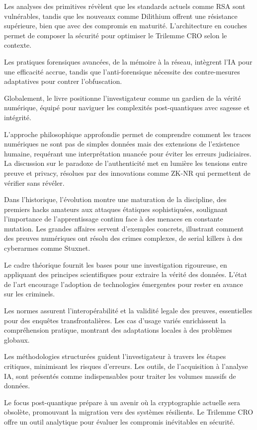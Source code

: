 \documentclass[a4paper,12pt]{extarticle}
\begin{document}
Les analyses des primitives révèlent que les standards actuels comme RSA sont vulnérables, tandis que les nouveaux comme Dilithium offrent une résistance supérieure, bien que avec des compromis en maturité. L'architecture en couches permet de composer la sécurité pour optimiser le Trilemme CRO selon le contexte.

Les pratiques forensiques avancées, de la mémoire à la réseau, intègrent l'IA pour une efficacité accrue, tandis que l'anti-forensique nécessite des contre-mesures adaptatives pour contrer l'obfuscation.

Globalement, le livre positionne l'investigateur comme un gardien de la vérité numérique, équipé pour naviguer les complexités post-quantiques avec sagesse et intégrité.

L'approche philosophique approfondie permet de comprendre comment les traces numériques ne sont pas de simples données mais des extensions de l'existence humaine, requérant une interprétation nuancée pour éviter les erreurs judiciaires. La discussion sur le paradoxe de l'authenticité met en lumière les tensions entre preuve et privacy, résolues par des innovations comme ZK-NR qui permettent de vérifier sans révéler.

Dans l'historique, l'évolution montre une maturation de la discipline, des premiers hacks amateurs aux attaques étatiques sophistiquées, soulignant l'importance de l'apprentissage continu face à des menaces en constante mutation. Les grandes affaires servent d'exemples concrets, illustrant comment des preuves numériques ont résolu des crimes complexes, de serial killers à des cyberarmes comme Stuxnet.

Le cadre théorique fournit les bases pour une investigation rigoureuse, en appliquant des principes scientifiques pour extraire la vérité des données. L'état de l'art encourage l'adoption de technologies émergentes pour rester en avance sur les criminels.

Les normes assurent l'interopérabilité et la validité legale des preuves, essentielles pour des enquêtes transfrontalières. Les cas d'usage variés enrichissent la compréhension pratique, montrant des adaptations locales à des problèmes globaux.

Les méthodologies structurées guident l'investigateur à travers les étapes critiques, minimisant les risques d'erreurs. Les outils, de l'acquisition à l'analyse IA, sont présentés comme indispensables pour traiter les volumes massifs de données.

Le focus post-quantique prépare à un avenir où la cryptographie actuelle sera obsolète, promouvant la migration vers des systèmes résilients. Le Trilemme CRO offre un outil analytique pour évaluer les compromis inévitables en sécurité.
\end{document}
